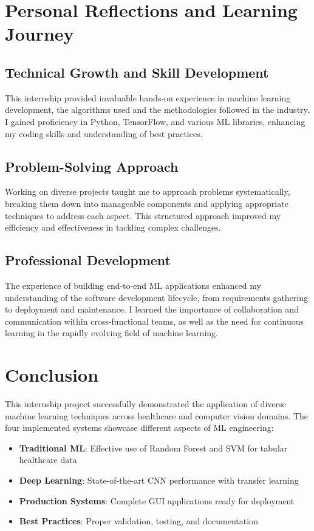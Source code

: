 \documentclass[12pt, a4paper]{article}
\begin{document}
\section{Personal Reflections and Learning Journey}

\subsection{Technical Growth and Skill Development}
This internship provided invaluable hands-on experience in machine learning development, the algorithms used and the methodologies followed in the industry. I gained proficiency in Python, TensorFlow, and various ML libraries, enhancing my coding skills and understanding of best practices.

\subsection{Problem-Solving Approach}
Working on diverse projects taught me to approach problems systematically, breaking them down into manageable components and applying appropriate techniques to address each aspect. This structured approach improved my efficiency and effectiveness in tackling complex challenges.

\subsection{Professional Development}
The experience of building end-to-end ML applications enhanced my understanding of the software development lifecycle, from requirements gathering to deployment and maintenance. I learned the importance of collaboration and communication within cross-functional teams, as well as the need for continuous learning in the rapidly evolving field of machine learning.

\section{Conclusion}

This internship project successfully demonstrated the application of diverse machine learning techniques across healthcare and computer vision domains. The four implemented systems showcase different aspects of ML engineering:

\begin{itemize}
    \item \textbf{Traditional ML}: Effective use of Random Forest and SVM for tabular healthcare data
    \item \textbf{Deep Learning}: State-of-the-art CNN performance with transfer learning
    \item \textbf{Production Systems}: Complete GUI applications ready for deployment
    \item \textbf{Best Practices}: Proper validation, testing, and documentation
\end{itemize}
\end{document}
